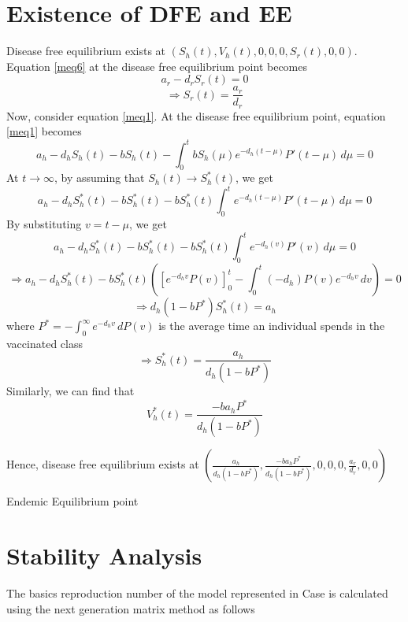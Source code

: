 \section{Existence of DFE and EE}
Disease free equilibrium exists at $(S_{h}(t), V_{h}(t), 0, 0, 0, S_{r}(t), 0, 0)$. Equation \ref{meq6} at the disease free equilibrium point becomes
\[a_{r}-d_{r}S_{r}(t) = 0\]
\[\Rightarrow S_{r}(t) = \frac{a_{r}}{d_{r}}\]
Now, consider equation \ref{meq1}. At the disease free equilibrium point, equation \ref{meq1} becomes
\[a_{h}-d_{h}S_{h}(t)-bS_{h}(t)-\int_{0}^{t} bS_{h}(\mu)e^{-d_{h}(t-\mu)}P'(t-\mu) \,d\mu = 0\]
At $t \rightarrow \infty$, by assuming that $S_{h}(t) \rightarrow S^{*}_{h}(t)$, we get
\[a_{h}-d_{h}S^{*}_{h}(t)-bS^{*}_{h}(t)-bS^{*}_{h}(t)\int_{0}^{t}e^{-d_{h}(t-\mu)}P'(t-\mu) \,d\mu = 0\]
By substituting $v = t-\mu$, we get
\[a_{h}-d_{h}S^{*}_{h}(t)-bS^{*}_{h}(t)-bS^{*}_{h}(t)\int_{0}^{t}e^{-d_{h}(v)}P'(v) \,d\mu = 0\]
\[\Rightarrow a_{h}-d_{h}S^{*}_{h}(t)-bS^{*}_{h}(t)\left(\left[e^{-d_{h}v}P(v)\right]^{t}_{0}-\int_{0}^{t}(-d_{h})P(v)e^{-d_{h}v} \,dv\right) = 0\]
\[\Rightarrow d_{h}(1-bP^{*})S^{*}_{h}(t) = a_{h}\]
where $P^{*} = -\int_{0}^{\infty}e^{-d_{h}v} \,dP(v) $ is the average time an individual spends in the vaccinated class
\[\Rightarrow S^{*}_{h}(t) = \frac{a_{h}}{d_{h}(1-bP^{*})}\]
Similarly, we can find that
\[V^{*}_{h}(t) = \frac{-ba_{h}P^{*}}{d_{h}(1-bP^{*})}\]

Hence, disease free equilibrium exists at $\left(\frac{a_{h}}{d_{h}(1-bP^{*})},\frac{-ba_{h}P^{*}}{d_{h}(1-bP^{*})},0,0,0,\frac{a_{r}}{d_{r}},0,0\right)$

Endemic Equilibrium point
\section{Stability Analysis}
The basics reproduction number of the model represented in Case  is calculated using the next generation matrix method as follows

